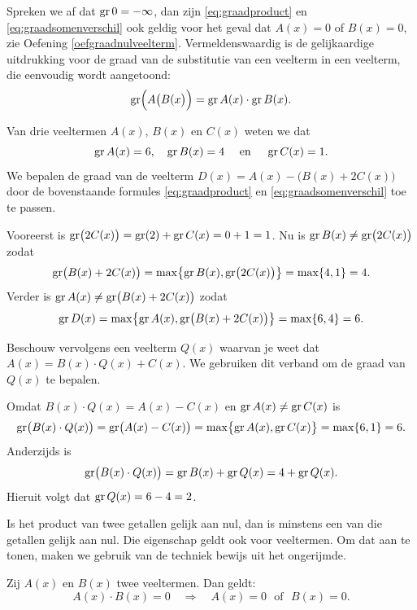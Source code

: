 \documentclass{ximera}
\begin{document}
\begin{Uitbreiding}
Spreken we af dat $\operatorname{gr} 0 = - \infty$, dan zijn \eqref{eq:graadproduct} en \eqref{eq:graadsomenverschil} ook geldig voor het geval dat $A(x) = 0$ of $B(x) = 0$, zie Oefening \ref{oefgraadnulveelterm}. Vermeldenswaardig is de gelijkaardige uitdrukking voor de graad van de substitutie van een veelterm in een veelterm, die eenvoudig wordt aangetoond:
\[
\operatorname{gr}\Bigl(A\bigl(B(x\bigr)\Bigr) = \operatorname{gr} A(x) \cdot \operatorname{gr} B(x).
\]
\end{Uitbreiding}

\begin{example} 
Van drie veeltermen $A(x)$, $B(x)$ en $C(x)$ weten we dat
\[
\operatorname{gr} A(x) = 6, \quad \operatorname{gr} B(x) = 4 \quad \text{ en } \quad \operatorname{gr} C(x) = 1.
\]
We bepalen de graad van de veelterm $D(x) = A(x) - \bigl(B(x) + 2C(x)\bigr)$ door de bovenstaande formules \eqref{eq:graadproduct} en \eqref{eq:graadsomenverschil} toe te passen. 

Vooreerst is $\operatorname{gr}\bigl(2C(x)\bigr) = \operatorname{gr}(2) + \operatorname{gr} C(x) = 0 + 1 = 1$. Nu is $\operatorname{gr} B(x) \neq \operatorname{gr}\bigl(2C(x)\bigr)$ zodat
\[
\operatorname{gr} \bigl(B(x) + 2C(x)\bigr) = \max \bigl\{\operatorname{gr} B(x),\operatorname{gr}\bigl(2C(x)\bigr)\bigr\} = \max\{4,1\} = 4.
\]
Verder is $\operatorname{gr} A(x) \neq \operatorname{gr}\bigl(B(x) + 2C(x)\bigr)$ zodat 
\[
\operatorname{gr} D(x) = \max \bigl\{\operatorname{gr} A(x),\operatorname{gr}\bigl(B(x) + 2C(x)\bigr)\bigr\} = \max\{6,4\} = 6.
\]

Beschouw vervolgens een veelterm $Q(x)$ waarvan je weet dat $A(x) = B(x)\cdot Q(x) + C(x)$. We gebruiken dit verband om de graad van $Q(x)$ te bepalen. 

Omdat $B(x)\cdot Q(x) = A(x) - C(x)$ en $\operatorname{gr} A(x) \neq \operatorname{gr} C(x)$ is
\[
\operatorname{gr}\bigl(B(x)\cdot Q(x)\bigr) = \operatorname{gr}\bigl(A(x) - C(x)\bigr) = \max \bigl\{\operatorname{gr} A(x),\operatorname{gr} C(x)\bigr\} = \max\{6,1\} = 6.
\]
Anderzijds is 
\[
\operatorname{gr}\bigl(B(x)\cdot Q(x)\bigr) = \operatorname{gr} B(x) + \operatorname{gr} Q(x) = 4 + \operatorname{gr} Q(x).
\]
Hieruit volgt dat $\operatorname{gr} Q(x) = 6-4 = 2$. 
\end{example} 

Is het product van twee getallen gelijk aan nul, dan is minstens een van die getallen gelijk aan nul. Die eigenschap geldt ook voor veeltermen. Om dat aan te tonen, maken we gebruik van de techniek bewijs uit het ongerijmde. 
 
\begin{proposition} 
Zij $A(x)$ en $B(x)$ twee veeltermen. Dan geldt: 
\[
A(x)\cdot B(x) = 0 \quad \Rightarrow \quad A(x) = 0 \,\,\text{ of } \,\, B(x) = 0.
\]
\end{proposition} 
\end{document}
